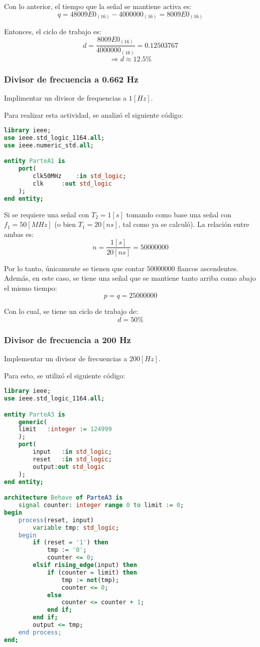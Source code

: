 \documentclass[../procedimientos.tex]{subfiles}
\begin{document}
Con lo anterior, el tiempo que la señal se mantiene activa es:
\[q = 48009E0_{(16)} - 4000000_{(16)} = 8009E0_{(16)}\]

Entonces, el ciclo de trabajo es:
\[d = \frac{8009E0_{(16)}}{4000000_{(16)}} = 0.12503767\]
\[\Rightarrow d \approx 12.5 \%\]

\subsubsection{Divisor de frecuencia a 0.662 Hz}
\begin{em}
  Implimentar un divisor de frequencias a $1 [Hz]$.
\end{em}

Para realizar esta actividad, se analizó el siguiente código:
\begin{lstlisting}[language=vhdl]
library ieee;
use ieee.std_logic_1164.all;
use ieee.numeric_std.all;

entity ParteA1 is
	port(
		clk50MHz	:in std_logic;
		clk		:out std_logic
	);
end entity;
\end{lstlisting}

Si se requiere una señal con $T_2 = 1 [s]$ tomando como base una señal con 
$f_1 = 50 [MHz]$ (o bien $T_1 = 20 [ns]$, tal como ya se calculó). La relación 
entre ambas es:
\[n = \frac{1[s]}{20 [ns]} = 50000000\]

Por lo tanto, únicamente se tienen que contar $50000000$ flancos ascendentes.  
Además, en este caso, se tiene una señal que se mantiene tanto arriba como 
abajo el mismo tiempo:
\[p = q = 25000000\]

Con lo cual, se tiene un ciclo de trabajo de:
\[d = 50\%\]

\subsubsection{Divisor de frecuencia a 200 Hz}
\begin{em}
  Implementar un divisor de frecuencias a $200 [Hz]$.
\end{em}

Para esto, se utilizó el siguiente código:
\begin{lstlisting}[language=vhdl]
library ieee;
use ieee.std_logic_1164.all;

entity ParteA3 is
	generic(
    limit	:integer := 124999
	);
	port(
		input	:in std_logic;
		reset	:in std_logic;
		output:out std_logic
	);
end entity;

architecture Behave of ParteA3 is
	signal counter: integer range 0 to limit := 0;
begin
	process(reset, input)
		variable tmp: std_logic;
	begin
		if (reset = '1') then
			tmp := '0';
			counter <= 0;
		elsif rising_edge(input) then
			if (counter = limit) then
				tmp := not(tmp);
				counter <= 0;
			else
				counter <= counter + 1;
			end if;
		end if;
		output <= tmp;
	end process;
end;
\end{lstlisting}
\end{document}
